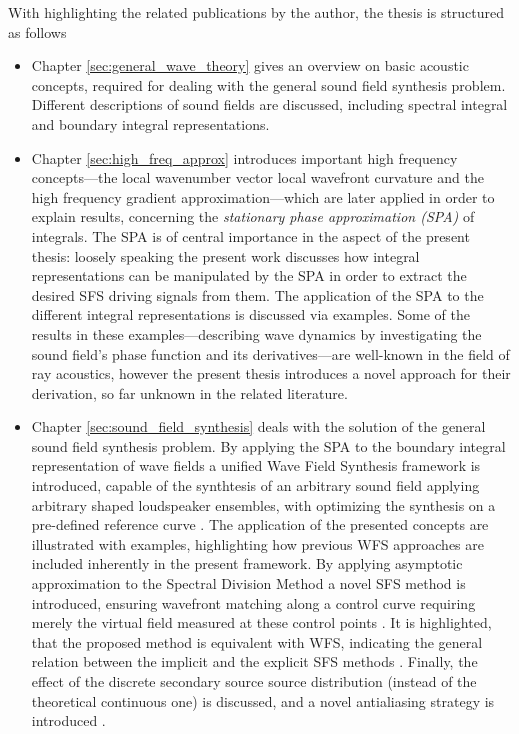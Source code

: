 With highlighting the related publications by the author, the thesis is structured as follows
\begin{itemize}
\item Chapter \ref{sec:general_wave_theory} gives an overview on basic acoustic concepts, required for dealing with the general sound field synthesis problem.
Different descriptions of sound fields are discussed, including spectral integral and boundary integral representations.
%
\item Chapter \ref{sec:high_freq_approx} introduces important high frequency concepts---the local wavenumber  vector local wavefront curvature and the high frequency gradient approximation---which are later applied in order to explain results, concerning the \emph{stationary phase approximation (SPA)} of integrals.
The SPA is of central importance in the aspect of the present thesis: loosely speaking the present work discusses how integral representations can be manipulated by the SPA in order to extract the desired SFS driving signals from them.
The application of the SPA to the different integral representations is discussed via examples.
Some of the results in these examples---describing wave dynamics by investigating the sound field's phase function and its derivatives---are well-known in the field of ray acoustics, however the present thesis introduces a novel approach for their derivation, so far unknown in the related literature.
%
\item Chapter \ref{sec:sound_field_synthesis} deals with the solution of the general sound field synthesis problem.
By applying the SPA to the boundary integral representation of wave fields	 a unified Wave Field Synthesis framework is introduced, capable of the synthtesis of an arbitrary sound field applying arbitrary shaped loudspeaker ensembles, with optimizing the synthesis on a pre-defined reference curve \cite{Firtha2016, schultz2017wave}.
The application of the presented concepts are illustrated with examples, highlighting how previous WFS approaches are included inherently in the present framework.
By applying asymptotic approximation to the Spectral Division Method a novel SFS method is introduced, ensuring wavefront matching along a control curve requiring merely the virtual field measured at these control points \cite{Firtha2017:daga}.
It is highlighted, that the proposed method is equivalent with WFS, indicating the general relation between the implicit and the explicit SFS methods \cite{Firtha2018:WFS_vs_SDM}.
Finally, the effect of the discrete secondary source source distribution (instead of the theoretical continuous one) is discussed, and a novel antialiasing strategy is introduced \cite{Firtha2018_daga_a}.

\end{itemize}
